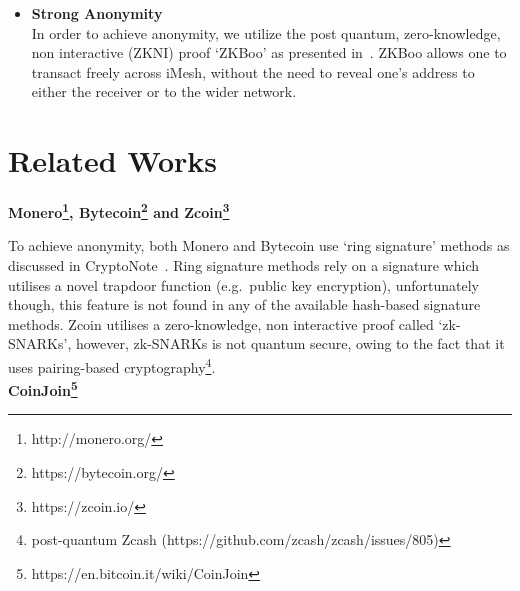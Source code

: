 \documentclass[a4paper,10pt,twocolumn]{article}
\begin{document}
\begin{itemize}
	As such, we focus our attention on the family of hash-based signature methods instead. Some hash based functions 
	such as `SPHINCS', provide us with the ability to reuse the same public key multiple times, which is a step in the right direction. 
	However, SPHINCS also suffers from the same large public key size (around 1 kilobyte) as the other methods, again making it unsuitable 
	for our application. Eventually, the `eXtended Merkle Signature Scheme' (XMSS) was identified as being the ideal balance of human 
	usability and small key size. XMSS allows us to repeatedly utilise the same public key a large number of times (1000 times or more). 
	However, unlike SPHINCS, XMSS has a lightweight public key of only 32 bytes and a signature key size of approximately 3 kilobytes. By utilising XMSS we also benefit from \( 2^{128} \) bit post-quantum security~\cite{recom}.
	
	\item\textbf{Strong Anonymity}\\ 
	In order to achieve anonymity, we utilize the post quantum, zero-knowledge, non interactive (ZKNI) proof `ZKBoo' as presented 
	in~\cite{zkboo}. ZKBoo allows one to transact freely across iMesh, without the need to reveal one's address to either the receiver or to the wider network.
	\end{itemize}
	
	\section{Related Works}
	
	{\bf Monero\footnote{http://monero.org/}, Bytecoin\footnote{https://bytecoin.org/} and Zcoin\footnote{https://zcoin.io/}}
	
	To achieve anonymity, both Monero and Bytecoin use `ring signature' methods as discussed in CryptoNote~\cite{ringsig}.
	Ring signature methods rely on a signature which utilises a novel trapdoor function (e.g.\ public key encryption), unfortunately though, this feature is 
	not found in any of the available hash-based signature methods. Zcoin utilises a zero-knowledge, non interactive proof called `zk-SNARKs', however, zk-SNARKs is not quantum secure, owing to the fact that it uses pairing-based 
	cryptography\footnote{post-quantum Zcash (https://github.com/zcash/zcash/issues/805)}. 
	\\
	
	\noindent
	{\bf CoinJoin\footnote{https://en.bitcoin.it/wiki/CoinJoin}}
	
\end{document}
